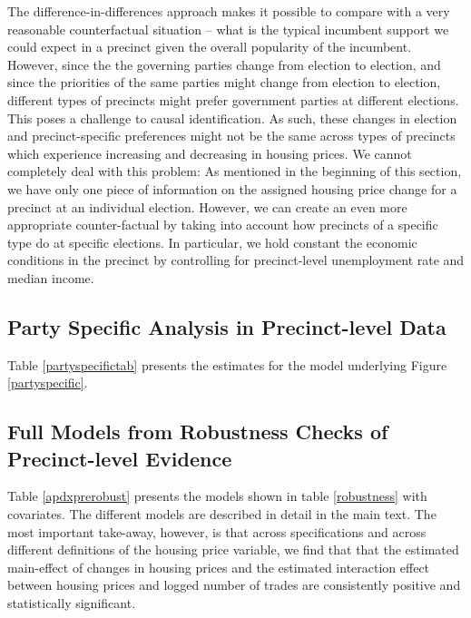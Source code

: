 \documentclass[12pt,a4paper]{article}
\begin{document}
			The difference-in-differences approach makes it possible to compare with a very reasonable counterfactual situation -- what is the typical incumbent support we could expect in a precinct given the overall popularity of the incumbent. However, since the the governing parties change from election to election, and since the priorities of the same parties might change from election to election, different types of precincts might prefer government parties at  different elections. This poses a challenge to causal identification. As such,  these changes in election and precinct-specific preferences might not be the same across types of precincts which experience increasing and decreasing in housing prices. We cannot completely deal with this problem: As mentioned in the beginning of this section, we have only one piece of information on the assigned housing price change for a precinct at an individual election. However, we can create an even more appropriate counter-factual by taking into account how precincts of a specific type do at specific elections. In particular, we hold constant the economic conditions in the precinct by controlling for precinct-level unemployment rate and median income.
			
			\newpage
			
			\subsection{Party Specific Analysis in Precinct-level Data} \label{app_partyspec}
			\setcounter{table}{0}
			
			Table \ref{partyspecifictab} presents the estimates for the model underlying Figure \ref{partyspecific}.

			
			
			
			\newpage
			
			\subsection{Full Models from Robustness Checks of Precinct-level Evidence} \label{app_robustpred}
			\setcounter{table}{0}
			
			Table \ref{apdxprerobust} presents the models shown in table \ref{robustness} with covariates. The different models are described in detail in the main text. The most important take-away, however, is that across specifications and across different definitions of the housing price variable, we find that that the estimated main-effect of changes in housing prices  and the estimated interaction effect between housing prices and logged number of trades are consistently positive and statistically significant.
			
\end{document}
